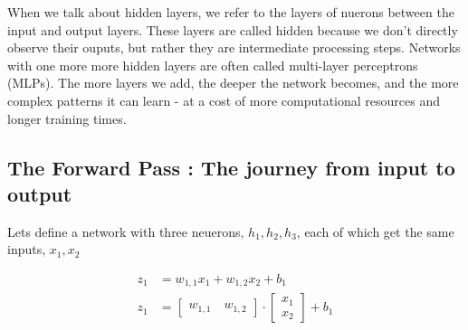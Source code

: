 \documentclass[9pt]{extarticle}
\begin{document}
When we talk about hidden layers, we refer to the layers of nuerons between the input and output layers. These layers are called hidden because we don't directly observe their ouputs, but rather they are intermediate processing steps. Networks with one more more hidden layers are often called multi-layer perceptrons (MLPs). The more layers we add, the deeper the network becomes, and the more complex patterns it can learn - at a cost of more computational resources and longer training times.

\pagebreak

\subsection{The Forward Pass : The journey from input to output}
Lets define a network with three neuerons, $h_1, h_2, h_3$, each of which get the same inputs, $x_1, x_2$ \\[4ex]
\begin{minipage}{0.3\textwidth}
    \begin{center}

        \begin{align*}
            z_1 & = w_{1,1}x_1 + w_{1,2}x_2 + b_1                                                                           \\
            z_1 & = \begin{bmatrix} w_{1,1} \quad w_{1,2} \end{bmatrix}\cdot \begin{bmatrix} x_1 \\ x_2 \end{bmatrix} + b_1 \\
        \end{align*}
    \end{center}
\end{minipage}
\end{document}
